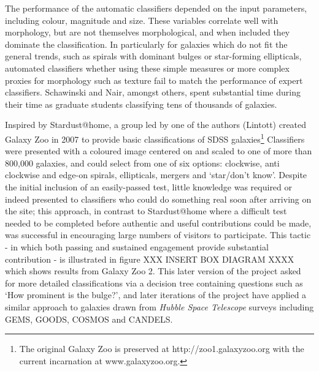 \documentclass{ar2e}
\begin{document}
\begin{itemize}
The performance of the automatic classifiers depended on the input parameters,
including colour, magnitude and size. These variables correlate well with
morphology, but are not themselves morphological, and when included they
dominate the classification. In particularly for galaxies which do not fit the
general trends, such as spirals with dominant bulges or star-forming
ellipticals, automated classifiers whether using these simple measures or more
complex proxies for morphology such as texture fail to match the performance
of expert classifiers. Schawinski and Nair, amongst others, spent substantial
time during their time as graduate students classifying tens of thousands of
galaxies. 

Inspired by Stardust@home, a group led by one of the authors (Lintott) created
Galaxy Zoo in 2007 to provide basic classifications of SDSS
galaxies\footnote{The original Galaxy Zoo is preserved at
http://zoo1.galaxyzoo.org with the current incarnation at www.galaxyzoo.org.}
Classifiers were presented with a coloured image centered on and scaled to one
of more than 800,000 galaxies, and could select from one of six options:
clockwise, anti clockwise and edge-on spirals, ellipticals, mergers and
`star/don't know'. Despite the initial inclusion of an easily-passed test,
little knowledge was required or indeed presented to classifiers who could do
something real soon after arriving on the site; this approach, in contrast to
Stardust@home where a difficult test needed to be completed before authentic
and useful contributions could be made, was successful in encouraging large
numbers of visitors to participate. This tactic - in which both passing and
sustained engagement provide substantial contribution - is illustrated in
figure XXX INSERT BOX DIAGRAM XXXX which shows results from Galaxy Zoo 2. This
later version of the project asked for more detailed classifications via a
decision tree containing questions such as `How prominent is the bulge?', and
later iterations of the project have applied a similar approach to galaxies
drawn from \emph{Hubble Space Telescope} surveys including \textsc{GEMS,
GOODS, COSMOS} and \textsc{CANDELS}. 


\end{itemize}
\end{document}
